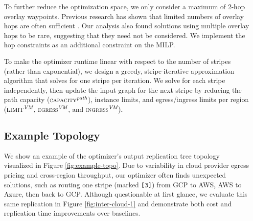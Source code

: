 
\label{edge-filtering}
To further reduce the optimization space, we only consider a maximum of 2-hop overlay waypoints. Previous research has shown that limited numbers of overlay hops are often sufficient \cite{andersen2001resilient, peter2014one, stoica2002internet}. Our analysis also found solutions using multiple overlay hops to be rare, suggesting that they need not be considered. We implement the hop constraints as an additional constraint on the MILP. 

 To make the optimizer runtime linear with respect to the number of stripes (rather than exponential), we design a greedy, stripe-iterative approximation algorithm that solves for one stripe per iteration. We solve for each stripe independently, then update the input graph for the next stripe by reducing the path capacity ($\small{\textsc{capacity}^\textit{path}}$), instance limits, and egress/ingress limits per region ($\textsc{limit}^{\textit{VM}}$, $\small{\textsc{egress}^{\textit{VM}}}$, and $\small{\textsc{ingress}^{\textit{VM}}}$).

\subsection{Example Topology}
We show an example of the optimizer's output replication tree topology visualized in Figure \ref{fig:example-topo}. Due to variability in cloud provider egress pricing and cross-region throughput, our optimizer often finds unexpected solutions, such as routing one stripe (marked \texttt{[3]}) from GCP to AWS, AWS to Azure, then back to GCP. Although questionable at first glance, we evaluate this same replication in Figure \ref{fig:inter-cloud-1} and demonstrate both cost and replication time improvements over baselines. 
